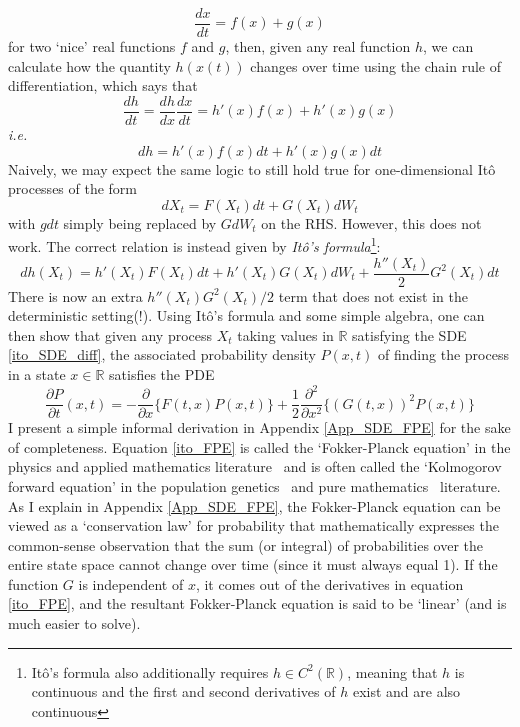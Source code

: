 \begin{equation*}
	\frac{dx}{dt} = f(x) + g(x)
\end{equation*}
for two `nice' real functions $f$ and $g$, then, given any real function $h$, we can calculate how the quantity $h(x(t))$ changes over time using the chain rule of differentiation, which says that
\begin{equation*}
\frac{dh}{dt} = \frac{dh}{dx}\frac{dx}{dt} = h'(x)f(x) + h'(x)g(x)
\end{equation*}
\emph{i.e.}
\begin{equation*}
dh =  h'(x)f(x)dt + h'(x)g(x)dt
\end{equation*}
Naively, we may expect the same logic to still hold true for one-dimensional It\^o processes of the form
\begin{equation*}
dX_t = F(X_t)dt + G(X_t)dW_t
\end{equation*}
with $gdt$ simply being replaced by $GdW_t$ on the RHS. However, this does not work. The correct relation is instead given by 
\emph{It\^o's formula}\footnote{It\^o's formula also additionally requires $h \in C^2(\mathbb{R})$, meaning that $h$ is continuous and the first and second derivatives of $h$ exist and are also continuous}:
\begin{equation*}
dh(X_t) = h'(X_t)F(X_t)dt + h'(X_t)G(X_t)dW_t  + \frac{h''(X_t)}{2}G^2(X_t)dt 
\end{equation*}
There is now an extra $h''(X_t)G^2(X_t)/2$ term that does not exist in the deterministic setting(!). Using It\^o's formula and some simple algebra, one can then show that given any process $X_t$ taking values in $\mathbb{R}$ satisfying the SDE \eqref{ito_SDE_diff}, the associated probability density $P(x,t)$ of finding the process in a state $x \in \mathbb{R}$ satisfies the PDE
\begin{equation}
\label{ito_FPE}
\frac{\partial P}{\partial t}(x,t) = -\frac{\partial}{\partial x}\{F(t,x)P(x,t)\} + \frac{1}{2}\frac{\partial^2}{\partial x^2}\{(G(t,x))^2P(x,t)\}
\end{equation}
I present a simple informal derivation in Appendix \ref{App_SDE_FPE} for the sake of completeness. Equation \eqref{ito_FPE} is called the `Fokker-Planck equation' in the physics and applied mathematics literature~\citep{gardiner_stochastic_2009} and is often called the `Kolmogorov forward equation' in the population genetics~\citep{ewens_mathematical_2004} and pure mathematics~\citep{oksendal_stochastic_1998} literature. As I explain in Appendix \ref{App_SDE_FPE}, the Fokker-Planck equation can be viewed as a `conservation law' for probability that mathematically expresses the common-sense observation that the sum (or integral) of probabilities over the entire state space cannot change over time (since it must always equal 1). If the function $G$ is independent of $x$, it comes out of the derivatives in equation \eqref{ito_FPE}, and the resultant Fokker-Planck equation is said to be `linear' (and is much easier to solve).

